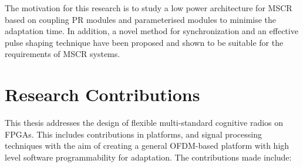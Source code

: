 The motivation for this research is to study a low power architecture for MSCR based on coupling PR modules and parameterised modules to minimise the adaptation time.
In addition, a novel method for synchronization and an effective pulse shaping technique have been proposed and shown to be suitable for the requirements of MSCR systems.
\section{Research Contributions}

This thesis addresses the design of flexible multi-standard cognitive radios on FPGAs. This includes contributions in platforms, and signal processing techniques with the aim of creating a general OFDM-based platform with high level software programmability for adaptation. The contributions made include:
